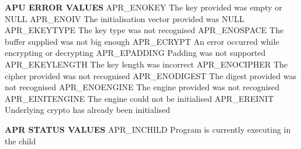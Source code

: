 \begin{DoxyPre}
{\bfseries APU ERROR VALUES}
APR\_ENOKEY         The key provided was empty or NULL
APR\_ENOIV          The initialisation vector provided was NULL
APR\_EKEYTYPE       The key type was not recognised
APR\_ENOSPACE       The buffer supplied was not big enough
APR\_ECRYPT         An error occurred while encrypting or decrypting
APR\_EPADDING       Padding was not supported
APR\_EKEYLENGTH     The key length was incorrect
APR\_ENOCIPHER      The cipher provided was not recognised
APR\_ENODIGEST      The digest provided was not recognised
APR\_ENOENGINE      The engine provided was not recognised
APR\_EINITENGINE    The engine could not be initialised
APR\_EREINIT        Underlying crypto has already been initialised
\end{DoxyPre}



\begin{DoxyPre}
{\bfseries APR STATUS VALUES}
APR\_INCHILD        Program is currently executing in the child
\end{DoxyPre}
 

